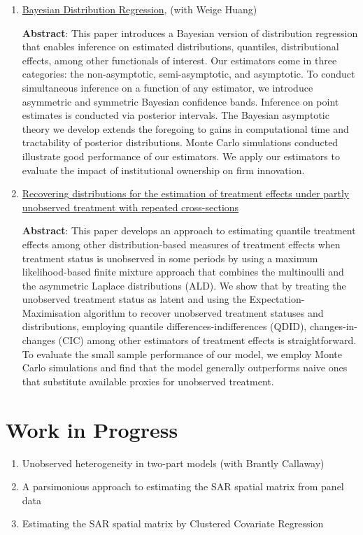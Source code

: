 \documentclass[12pt,letterpaper]{article}
\begin{document}
\begin{enumerate}
	
	\item \href{https://papers.ssrn.com/sol3/papers.cfm?abstract_id=3048658}{Bayesian Distribution Regression}, (with Weige Huang)
	
	\textbf{Abstract}: This paper introduces a Bayesian version of distribution regression that enables inference on estimated distributions, quantiles, distributional effects, among other functionals of interest. Our estimators come in three categories: the non-asymptotic, semi-asymptotic, and asymptotic. To conduct simultaneous inference on a function of any estimator, we introduce asymmetric and symmetric Bayesian confidence bands. Inference on point estimates is conducted via posterior intervals. The Bayesian asymptotic theory we develop extends the foregoing to gains in computational time and tractability of posterior distributions. Monte Carlo simulations conducted illustrate good performance of our estimators. We apply our estimators to evaluate the impact of institutional ownership on firm innovation. 
	
	\item \href{https://papers.ssrn.com/sol3/papers.cfm?abstract_id=3194286}{Recovering distributions for the estimation of treatment
		effects under partly unobserved treatment with repeated
		cross-sections}
	
	\textbf{Abstract}: This paper develops an approach to estimating quantile treatment effects among other distribution-based measures of treatment effects when treatment status is unobserved in some periods by using a maximum likelihood-based finite mixture approach that combines the multinoulli and the asymmetric Laplace distributions (ALD). We show that by treating the unobserved treatment status as latent and using the Expectation-Maximisation algorithm to recover unobserved treatment statuses and distributions, employing quantile differences-indifferences (QDID), changes-in-changes (CIC) among other estimators of treatment effects is straightforward. To evaluate the small sample performance of our model, we employ Monte Carlo simulations and find that the model generally outperforms naive ones that substitute available proxies for unobserved treatment.
\end{enumerate}

\section*{Work in Progress}
\begin{enumerate}
	\item Unobserved heterogeneity in two-part models (with Brantly Callaway)
	\item A parsimonious approach to estimating the SAR spatial matrix from panel data
	\item Estimating the SAR spatial matrix by Clustered Covariate Regression
\end{enumerate}
\end{document}
